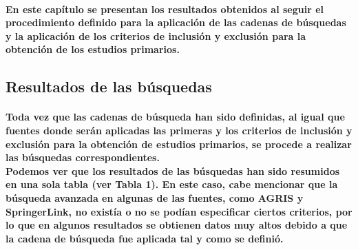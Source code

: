 \documentclass[10pt, twocolumn]{article}
\begin{document}
\paragraph{En este capítulo se presentan los resultados obtenidos al seguir el procedimiento definido para la aplicación de las cadenas de búsquedas y la aplicación de los criterios de inclusión y exclusión para la obtención de los estudios primarios.}

\subsection{Resultados de las búsquedas}
\paragraph{Toda vez que las cadenas de búsqueda han sido definidas, al igual que fuentes donde serán aplicadas las primeras y los criterios de inclusión y exclusión para la obtención de estudios primarios, se procede a realizar las búsquedas correspondientes. \\ Podemos ver que los resultados de las búsquedas han sido resumidos en una sola tabla (ver Tabla 1). En este caso, cabe mencionar que la búsqueda avanzada en algunas de las fuentes, como AGRIS y SpringerLink, no existía o no se podían especificar ciertos criterios, por lo que en algunos resultados se obtienen datos muy altos debido a que la cadena de búsqueda fue aplicada tal y como se definió.}
\end{document}
